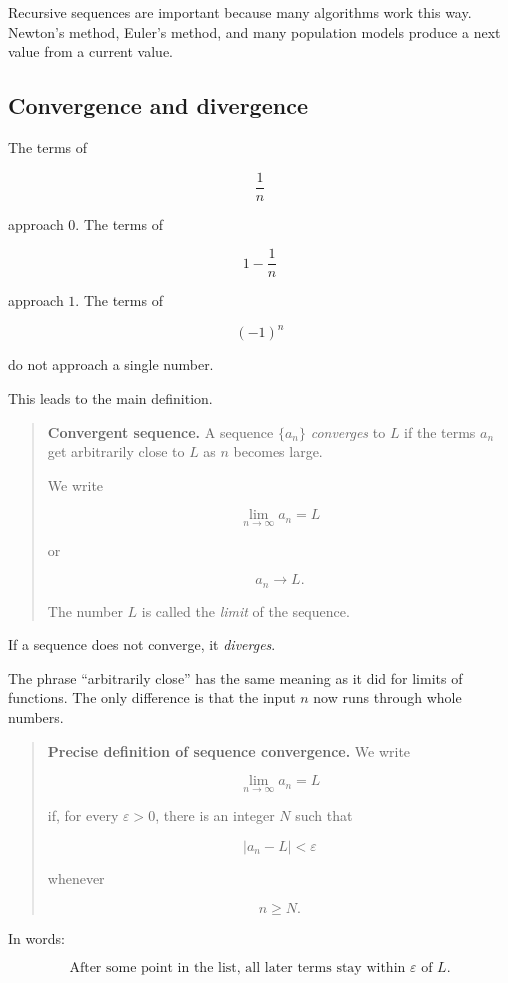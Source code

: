 Recursive sequences are important because many algorithms work this way.  Newton's
method, Euler's method, and many population models produce a next value from a
current value.

\subsection{Convergence and divergence}
\label{subsec:sequence-convergence-divergence}

The terms of

\[
\frac1n
\]

approach \(0\).  The terms of

\[
1-\frac1n
\]

approach \(1\).  The terms of

\[
(-1)^n
\]

do not approach a single number.

This leads to the main definition.

\begin{quote}
\textbf{Convergent sequence.}
A sequence \(\{a_n\}\) \emph{converges} to \(L\) if the terms \(a_n\) get arbitrarily
close to \(L\) as \(n\) becomes large.

We write

\[
\lim_{n\to\infty}a_n=L
\]

or

\[
a_n\to L.
\]

The number \(L\) is called the \emph{limit} of the sequence.
\end{quote}

If a sequence does not converge, it \emph{diverges}.

The phrase ``arbitrarily close'' has the same meaning as it did for limits of functions.
The only difference is that the input \(n\) now runs through whole numbers.

\begin{quote}
\textbf{Precise definition of sequence convergence.}
We write

\[
\lim_{n\to\infty}a_n=L
\]

if, for every \(\varepsilon>0\), there is an integer \(N\) such that

\[
|a_n-L|<\varepsilon
\]

whenever

\[
n\ge N.
\]
\end{quote}

In words:

\[
\boxed{
\text{After some point in the list, all later terms stay within \(\varepsilon\) of \(L\).}
}
\]

